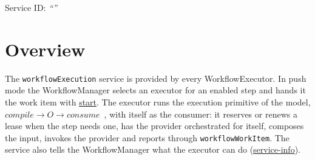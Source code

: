 \documentclass[a4paper]{arrowhead}
\newcommand{\oref}[1]{{\textcolor{ArrowheadBlue}{\hyperref[sec:operations:#1]{#1}}}}
\begin{document}
\ArrowheadSetup

\begin{center}
  \vspace*{1cm}
  \huge{\arrowtitle}

  \vspace*{0.2cm}
  \LARGE{\arrowtype}
  \vspace*{1cm}

  \Large{Service ID: \textit{``\arrowid''}}
  \vspace*{\fill}

  

  \vspace*{1cm}
  \vspace*{\fill}

  \begin{abstract}
    This document describes the \texttt{workflow\allowbreak{}Execution} service of the Eclipse Arrowhead workflow support systems, which runs work items on behalf of a WorkflowManager. It is provided by the WorkflowExecutor system, service version 1.0.0, documentation edition 5.4.0.
  \end{abstract}

  \vspace*{1cm}
\end{center}

\newpage

\tableofcontents
\newpage

\section{Overview}
\label{sec:overview}
The \texttt{workflow\allowbreak{}Execution} service is provided by every WorkflowExecutor. In push mode the
WorkflowManager selects an executor for an enabled step and hands it the work item with \oref{start}. The executor
runs the execution primitive of the model, $compile \rightarrow O \rightarrow consume$~\cite{varga2026}, with itself
as the consumer: it reserves or renews a lease when the step needs one, has the provider orchestrated for itself,
composes the input, invokes the provider and reports through \texttt{workflow\allowbreak{}Work\allowbreak{}Item}. The service also tells the
WorkflowManager what the executor can do (\oref{service-info}).
\end{document}
